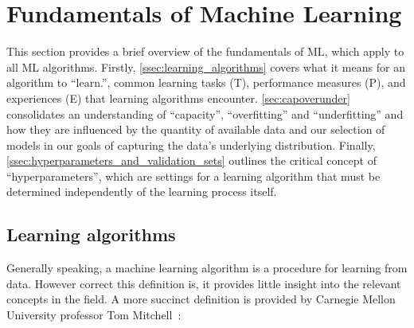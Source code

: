 \section{Fundamentals of Machine Learning}\label{sec:fundamentals_of_machine_learning}



This section provides a brief overview of the fundamentals of \gls{ML}, which apply to all \gls{ML} algorithms. Firstly, \autoref{ssec:learning_algorithms} covers what it means for an algorithm to ``learn.'', common learning tasks (T), performance measures (P), and experiences (E) that learning algorithms encounter. \autoref{sec:capoverunder} consolidates an understanding of ``capacity'', ``overfitting'' and ``underfitting'' and how they are influenced by the quantity of available data and our selection of models in our goals of capturing the data's underlying distribution. Finally, \autoref{ssec:hyperparameters_and_validation_sets} outlines the critical concept of ``hyperparameters'', which are settings for a learning algorithm that must be determined independently of the learning process itself.

\subsection{Learning algorithms}\label{ssec:learning_algorithms}
Generally speaking, a machine learning algorithm is a procedure for learning from data. However correct this definition is, it provides little insight into the relevant concepts in the field. A more succinct definition is provided by Carnegie Mellon University professor Tom Mitchell~\cite{Mitchell97LearningAlgorithm}:

